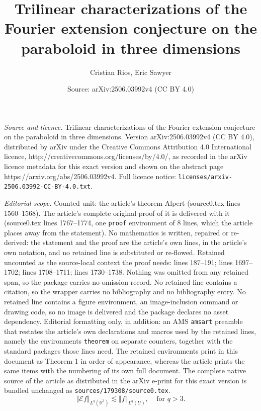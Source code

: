 \documentclass[10pt,a4paper]{amsart}
\title{Trilinear characterizations of the Fourier extension conjecture on the paraboloid in three dimensions}
\author{Cristian Rios, Eric Sawyer}
\date{Source: arXiv:2506.03992v4 (CC BY 4.0)}
\begin{document}
\maketitle

\noindent\emph{Source and licence.} Trilinear characterizations of the Fourier extension conjecture on the paraboloid in three dimensions. Version arXiv:2506.03992v4 (CC BY 4.0), distributed by arXiv under the Creative Commons Attribution 4.0 International licence, http://creativecommons.org/licenses/by/4.0/, as recorded in the arXiv licence metadata for this exact version and shown on the abstract page https://arxiv.org/abs/2506.03992v4. Full licence notice: \texttt{licenses/arxiv-2506.03992-CC-BY-4.0.txt}.\par\smallskip

\noindent\textit{Editorial scope.} Counted unit: the article's theorem Alpert (source0.tex lines 1560--1568). The article's complete original proof of it is delivered with it (source0.tex lines 1767--1774, one \texttt{proof} environment of 8 lines, which the article places away from the statement). No mathematics is written, repaired or re-derived: the statement and the proof are the article's own lines, in the article's own notation, and no retained line is substituted or re-flowed.  Retained uncounted as the source-local context the proof needs: lines 187--191; lines 1697--1702; lines 1708--1711; lines 1730--1738.  Nothing was omitted from any retained span, so the package carries no omission record.  No retained line contains a citation, so the wrapper carries no bibliography and no bibliography entry.  No retained line contains a figure environment, an image-inclusion command or drawing code, so no image is delivered and the package declares no asset dependency.  Editorial formatting only, in addition: an AMS \texttt{amsart} preamble that restates the article's own declarations and macros used by the retained lines, namely the environments \texttt{theorem} on separate counters, together with the standard packages those lines need.  The retained environments print in this document as Theorem 1 in order of appearance, whereas the article prints the same items with the numbering of its own full document.  The complete native source of the article as distributed in the arXiv e-print for this exact version is bundled unchanged as \texttt{sources/179308/source0.tex}.
\begin{equation}
\left\Vert \mathcal{E}f\right\Vert _{L^{q}\left(  \mathbb{R}^{3}\right)
}\lesssim\left\Vert f\right\Vert _{L^{q}\left(  U\right)  }%
,\ \ \ \ \ \text{for }q>3.\label{FEC}%
\end{equation}
\end{document}
